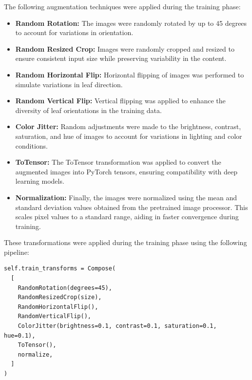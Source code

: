 The following augmentation techniques were applied during the training phase:

\begin{itemize}
    \item \textbf{Random Rotation:} The images were randomly rotated by up to 45 degrees to account for variations in orientation.
    \item \textbf{Random Resized Crop:} Images were randomly cropped and resized to ensure consistent input size while preserving variability in the content.
    \item \textbf{Random Horizontal Flip:} Horizontal flipping of images was performed to simulate variations in leaf direction.
    \item \textbf{Random Vertical Flip:} Vertical flipping was applied to enhance the diversity of leaf orientations in the training data.
    \item \textbf{Color Jitter:} Random adjustments were made to the brightness, contrast, saturation, and hue of images to account for variations in lighting and color conditions.
    \item \textbf{ToTensor:} The ToTensor transformation was applied to convert the augmented images into PyTorch tensors, ensuring compatibility with deep learning models.
    \item \textbf{Normalization:} Finally, the images were normalized using the mean and standard deviation values obtained from the pretrained image processor. This scales pixel values to a standard range, aiding in faster convergence during training.
\end{itemize}

These transformations were applied during the training phase using the following pipeline:



\begin{lstlisting}
self.train_transforms = Compose(
  [
    RandomRotation(degrees=45),
    RandomResizedCrop(size),
    RandomHorizontalFlip(),
    RandomVerticalFlip(),
    ColorJitter(brightness=0.1, contrast=0.1, saturation=0.1, hue=0.1),
    ToTensor(),
    normalize,
  ]
)
\end{lstlisting}

